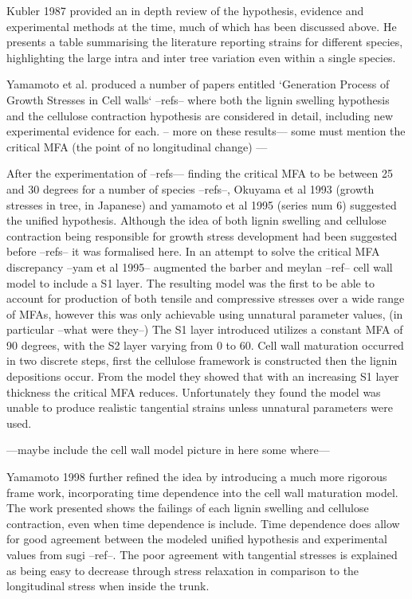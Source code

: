 \documentclass{article}
\begin{document}
Kubler 1987 provided an in depth review of the hypothesis, evidence and
experimental methods at the time, much of which has been discussed above. He
presents a table summarising the literature reporting strains for different
species, highlighting the large intra and inter tree variation even within a
single species.

Yamamoto et al. produced a number of papers entitled `Generation Process of
Growth Stresses in Cell walls` --refs-- where both the lignin swelling
hypothesis and the cellulose contraction hypothesis are considered in detail,
including new experimental evidence for each. -- more on these results--- some
must mention the critical MFA (the point of no longitudinal change) ---

After the experimentation of --refs--- finding the critical MFA to be between
25 and 30 degrees for a number of species --refs--, Okuyama et al 1993 (growth
stresses in tree, in Japanese) and yamamoto et al 1995 (series num 6) suggested the
unified hypothesis. Although the idea of both lignin swelling and cellulose
contraction being responsible for growth stress development had been suggested
before --refs-- it was formalised here. In an attempt to solve the critical MFA
discrepancy --yam et al 1995-- augmented the barber and meylan --ref-- cell wall
model to include a S1 layer. The resulting model was the first to be able to
account for production of both tensile and compressive stresses over a wide
range of MFAs, however this was only achievable using unnatural parameter values, (in
particular --what were they--) The S1 layer introduced utilizes a constant MFA
of 90 degrees, with the S2 layer varying from 0 to 60. Cell wall maturation
occurred in two discrete steps, first the cellulose framework is constructed then
the lignin depositions occur. From the model they showed that with an
increasing S1 layer thickness the critical MFA reduces. Unfortunately they found the model
was unable to produce realistic tangential strains unless unnatural parameters
were used.

---maybe include the cell wall model picture in here some where---

Yamamoto 1998 further refined the idea by introducing a much more rigorous frame
work, incorporating time dependence into the cell wall maturation model. The
work presented shows the failings of each lignin swelling and cellulose
contraction, even when time dependence is include. Time dependence does allow
for good agreement between the modeled unified hypothesis and experimental
values from sugi --ref--. The poor agreement with tangential stresses is
explained as being easy to decrease through stress relaxation in comparison to
the longitudinal stress when inside the trunk.
\end{document}
